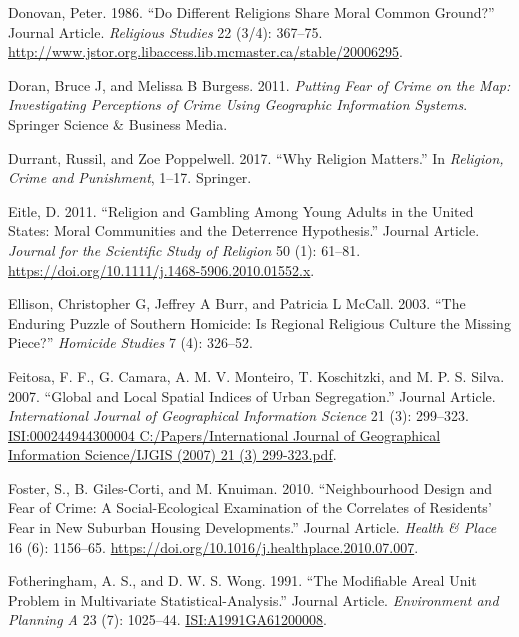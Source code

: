 \documentclass[smallextended]{svjour3}       %
\begin{document}
\leavevmode\hypertarget{ref-Donovan1986different}{}%
Donovan, Peter. 1986. ``Do Different Religions Share Moral Common
Ground?'' Journal Article. \emph{Religious Studies} 22 (3/4): 367--75.
\url{http://www.jstor.org.libaccess.lib.mcmaster.ca/stable/20006295}.

\leavevmode\hypertarget{ref-Doran2011putting}{}%
Doran, Bruce J, and Melissa B Burgess. 2011. \emph{Putting Fear of Crime
on the Map: Investigating Perceptions of Crime Using Geographic
Information Systems}. Springer Science \& Business Media.

\leavevmode\hypertarget{ref-Durrant2017religion}{}%
Durrant, Russil, and Zoe Poppelwell. 2017. ``Why Religion Matters.'' In
\emph{Religion, Crime and Punishment}, 1--17. Springer.

\leavevmode\hypertarget{ref-Eitle2011religion}{}%
Eitle, D. 2011. ``Religion and Gambling Among Young Adults in the United
States: Moral Communities and the Deterrence Hypothesis.'' Journal
Article. \emph{Journal for the Scientific Study of Religion} 50 (1):
61--81. \url{https://doi.org/10.1111/j.1468-5906.2010.01552.x}.

\leavevmode\hypertarget{ref-Ellison2003enduring}{}%
Ellison, Christopher G, Jeffrey A Burr, and Patricia L McCall. 2003.
``The Enduring Puzzle of Southern Homicide: Is Regional Religious
Culture the Missing Piece?'' \emph{Homicide Studies} 7 (4): 326--52.

\leavevmode\hypertarget{ref-Feitosa2007global}{}%
Feitosa, F. F., G. Camara, A. M. V. Monteiro, T. Koschitzki, and M. P.
S. Silva. 2007. ``Global and Local Spatial Indices of Urban
Segregation.'' Journal Article. \emph{International Journal of
Geographical Information Science} 21 (3): 299--323.
\href{ISI:000244944300004\%0AC:/Papers/International\%20Journal\%20of\%20Geographical\%20Information\%20Science/IJGIS\%20(2007)\%2021\%20(3)\%20299-323.pdf}{ISI:000244944300004
C:/Papers/International Journal of Geographical Information Science/IJGIS (2007) 21 (3) 299-323.pdf}.

\leavevmode\hypertarget{ref-Foster2010neighbourhood}{}%
Foster, S., B. Giles-Corti, and M. Knuiman. 2010. ``Neighbourhood Design
and Fear of Crime: A Social-Ecological Examination of the Correlates of
Residents' Fear in New Suburban Housing Developments.'' Journal Article.
\emph{Health \& Place} 16 (6): 1156--65.
\url{https://doi.org/10.1016/j.healthplace.2010.07.007}.

\leavevmode\hypertarget{ref-Fotheringham1991modifiable}{}%
Fotheringham, A. S., and D. W. S. Wong. 1991. ``The Modifiable Areal
Unit Problem in Multivariate Statistical-Analysis.'' Journal Article.
\emph{Environment and Planning A} 23 (7): 1025--44.
\url{ISI:A1991GA61200008}.
\end{document}
